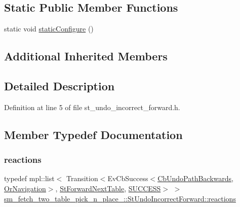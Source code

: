 \subsection*{Static Public Member Functions}
\begin{DoxyCompactItemize}
\item 
static void \hyperlink{structsm__fetch__two__table__pick__n__place__1_1_1StUndoIncorrectForward_a1ffcb18838bb43c02f8fe63ee918911d}{static\+Configure} ()
\end{DoxyCompactItemize}
\subsection*{Additional Inherited Members}


\subsection{Detailed Description}


Definition at line 5 of file st\+\_\+undo\+\_\+incorrect\+\_\+forward.\+h.



\subsection{Member Typedef Documentation}
\mbox{\label{structsm__fetch__two__table__pick__n__place__1_1_1StUndoIncorrectForward_a04362f45e5a504688c0df0c8c199d6d5}} 
\subsubsection{\texorpdfstring{reactions}{reactions}}
{\footnotesize\ttfamily typedef mpl\+::list$<$ Transition$<$Ev\+Cb\+Success$<$\hyperlink{classcl__move__base__z_1_1CbUndoPathBackwards}{Cb\+Undo\+Path\+Backwards}, \hyperlink{classsm__fetch__two__table__pick__n__place__1_1_1OrNavigation}{Or\+Navigation}$>$, \hyperlink{structsm__fetch__two__table__pick__n__place__1_1_1StForwardNextTable}{St\+Forward\+Next\+Table}, \hyperlink{classSUCCESS}{S\+U\+C\+C\+E\+SS}$>$ $>$ \hyperlink{structsm__fetch__two__table__pick__n__place__1_1_1StUndoIncorrectForward_a04362f45e5a504688c0df0c8c199d6d5}{sm\+\_\+fetch\+\_\+two\+\_\+table\+\_\+pick\+\_\+n\+\_\+place\+\_\+::\+St\+Undo\+Incorrect\+Forward\+::reactions}}



